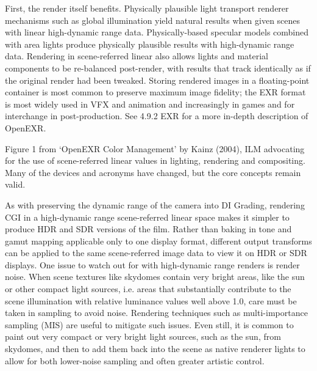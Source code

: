 First, the render itself benefits. Physically plausible light transport renderer mechanisms such as global illumination yield natural results when given scenes with linear high-dynamic range data. Physically-based specular models combined with area lights produce physically plausible results with high-dynamic range data. Rendering in scene-referred linear also allows lights and material components to be re-balanced post-render, with results that track identically as if the original render had been tweaked. Storing rendered images in a floating-point container is most common to preserve maximum image fidelity; the EXR format is most widely used in VFX and animation and increasingly in games and for interchange in post-production. See 4.9.2 EXR for a more in-depth description of OpenEXR.

Figure 1 from ‘OpenEXR Color Management’ by Kainz (2004), ILM advocating for the use of scene-referred linear values in lighting, rendering and compositing. Many of the devices and acronyms have changed, but the core concepts remain valid.

As with preserving the dynamic range of the camera into DI Grading, rendering CGI in a high-dynamic range scene-referred linear space makes it simpler to produce HDR and SDR versions of the film. Rather than baking in tone and gamut mapping applicable only to one display format, different output transforms can be applied to the same scene-referred image data to view it on HDR or SDR displays.
One issue to watch out for with high-dynamic range renders is render noise. When scene textures like skydomes contain very bright areas, like the sun or other compact light sources, i.e. areas that substantially contribute to the scene illumination with relative luminance values well above 1.0, care must be taken in sampling to avoid noise. Rendering techniques such as multi-importance sampling (MIS) are useful to mitigate such issues. Even still, it is common to paint out very compact or very bright light sources, such as the sun, from skydomes, and then to add them back into the scene as native renderer lights to allow for both lower-noise sampling and often greater artistic control.

